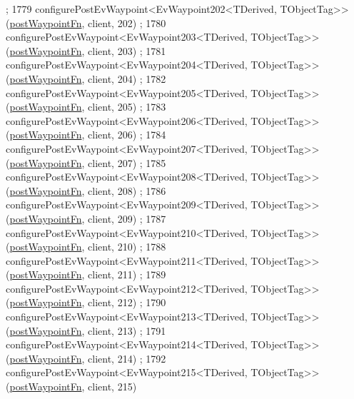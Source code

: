 \begin{DoxyCode}
      ;
1779     configurePostEvWaypoint<EvWaypoint202<TDerived, TObjectTag>>(\hyperlink{classsmacc_1_1WaypointEventDispatcher_a6bccf6a93a827634b7b5e67ac0e4ec57}{postWaypointFn}, client, 202)
      ;
1780     configurePostEvWaypoint<EvWaypoint203<TDerived, TObjectTag>>(\hyperlink{classsmacc_1_1WaypointEventDispatcher_a6bccf6a93a827634b7b5e67ac0e4ec57}{postWaypointFn}, client, 203)
      ;
1781     configurePostEvWaypoint<EvWaypoint204<TDerived, TObjectTag>>(\hyperlink{classsmacc_1_1WaypointEventDispatcher_a6bccf6a93a827634b7b5e67ac0e4ec57}{postWaypointFn}, client, 204)
      ;
1782     configurePostEvWaypoint<EvWaypoint205<TDerived, TObjectTag>>(\hyperlink{classsmacc_1_1WaypointEventDispatcher_a6bccf6a93a827634b7b5e67ac0e4ec57}{postWaypointFn}, client, 205)
      ;
1783     configurePostEvWaypoint<EvWaypoint206<TDerived, TObjectTag>>(\hyperlink{classsmacc_1_1WaypointEventDispatcher_a6bccf6a93a827634b7b5e67ac0e4ec57}{postWaypointFn}, client, 206)
      ;
1784     configurePostEvWaypoint<EvWaypoint207<TDerived, TObjectTag>>(\hyperlink{classsmacc_1_1WaypointEventDispatcher_a6bccf6a93a827634b7b5e67ac0e4ec57}{postWaypointFn}, client, 207)
      ;
1785     configurePostEvWaypoint<EvWaypoint208<TDerived, TObjectTag>>(\hyperlink{classsmacc_1_1WaypointEventDispatcher_a6bccf6a93a827634b7b5e67ac0e4ec57}{postWaypointFn}, client, 208)
      ;
1786     configurePostEvWaypoint<EvWaypoint209<TDerived, TObjectTag>>(\hyperlink{classsmacc_1_1WaypointEventDispatcher_a6bccf6a93a827634b7b5e67ac0e4ec57}{postWaypointFn}, client, 209)
      ;
1787     configurePostEvWaypoint<EvWaypoint210<TDerived, TObjectTag>>(\hyperlink{classsmacc_1_1WaypointEventDispatcher_a6bccf6a93a827634b7b5e67ac0e4ec57}{postWaypointFn}, client, 210)
      ;
1788     configurePostEvWaypoint<EvWaypoint211<TDerived, TObjectTag>>(\hyperlink{classsmacc_1_1WaypointEventDispatcher_a6bccf6a93a827634b7b5e67ac0e4ec57}{postWaypointFn}, client, 211)
      ;
1789     configurePostEvWaypoint<EvWaypoint212<TDerived, TObjectTag>>(\hyperlink{classsmacc_1_1WaypointEventDispatcher_a6bccf6a93a827634b7b5e67ac0e4ec57}{postWaypointFn}, client, 212)
      ;
1790     configurePostEvWaypoint<EvWaypoint213<TDerived, TObjectTag>>(\hyperlink{classsmacc_1_1WaypointEventDispatcher_a6bccf6a93a827634b7b5e67ac0e4ec57}{postWaypointFn}, client, 213)
      ;
1791     configurePostEvWaypoint<EvWaypoint214<TDerived, TObjectTag>>(\hyperlink{classsmacc_1_1WaypointEventDispatcher_a6bccf6a93a827634b7b5e67ac0e4ec57}{postWaypointFn}, client, 214)
      ;
1792     configurePostEvWaypoint<EvWaypoint215<TDerived, TObjectTag>>(\hyperlink{classsmacc_1_1WaypointEventDispatcher_a6bccf6a93a827634b7b5e67ac0e4ec57}{postWaypointFn}, client, 215)

\end{DoxyCode}
